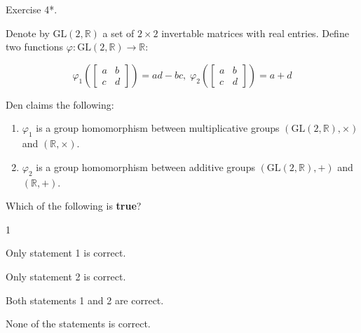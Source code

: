 \documentclass[../lecture-notes-148x210.tex]{subfiles}
\begin{document}
\begin{xexercise}
    {Exercise 4*.}
    {
        Denote by $\text{GL}(2,\mathbb{R})$ a set of $2\times 2$ invertable matrices with real entries. Define 
        two functions $\varphi: \text{GL}(2,\mathbb{R}) \to \mathbb{R}$:
        
        \begin{equation*}
            \varphi_1 \left(\begin{bmatrix}
                a & b \\ c & d
            \end{bmatrix}\right) = ad - bc, \; \varphi_2 \left(\begin{bmatrix}
                a & b \\ c & d
            \end{bmatrix}\right) = a + d
        \end{equation*}
        
        Den claims the following:
        \begin{enumerate}
            \item $\varphi_1$ is a group homomorphism between multiplicative groups $(\text{GL}(2,\mathbb{R}), \times)$ and $(\mathbb{R}, \times)$.
            \item $\varphi_2$ is a group homomorphism between additive groups $(\text{GL}(2, \mathbb{R}), +)$ and $(\mathbb{R}, +)$.
        \end{enumerate}
        
        Which of the following is \textbf{true}?
    }
    {1}
    {
        \item Only statement 1 is correct.
        \item Only statement 2 is correct.
        \item Both statements 1 and 2 are correct.
        \item None of the statements is correct.
    }

\end{xexercise}
\end{document}

